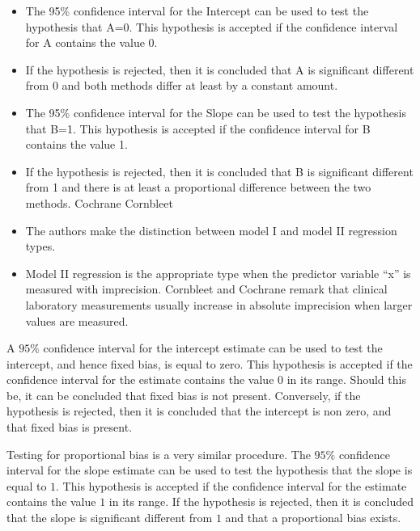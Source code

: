\documentclass[12pt, a4paper]{report}
\theoremstyle{plain}
\theoremstyle{definition}
\theoremstyle{remark}
\begin{document}
\begin{itemize}
	
	\item The 95\% confidence interval for the Intercept can be used to test the hypothesis that A=0. This hypothesis is accepted if the confidence interval for A contains the value 0. 
	\item If the hypothesis is rejected, then it is concluded that A is significant different from 0 and both methods differ at least by a constant amount. 
	
	\item The 95\% confidence interval for the Slope can be used to test the hypothesis that B=1. This hypothesis is accepted if the confidence interval for B contains the value 1. 
	
	\item If the hypothesis is rejected, then it is concluded that B is significant different from 1 and there is at least a proportional difference between the two methods. Cochrane Cornbleet
	\item The authors make the distinction between model I and model II regression types.
	\item Model II regression is the appropriate type when the predictor variable “x” is measured with imprecision.
	Cornbleet and Cochrane remark that clinical laboratory measurements usually increase in absolute imprecision when larger values are measured. %
\end{itemize}

A $95\%$ confidence interval for the intercept estimate can be used to test the intercept, and hence fixed bias, is equal to
zero. This hypothesis is accepted if the confidence interval for the estimate contains the value $0$ in its range. Should this be,
it can be concluded that fixed bias is not present. Conversely, if the hypothesis is rejected, then it is concluded that the
intercept is non zero, and that fixed bias is present.

Testing for proportional bias is a very similar procedure. The $95\%$ confidence interval for the slope estimate can be used to
test the hypothesis that the slope is equal to $1$. This hypothesis is accepted if the confidence interval for the estimate
contains the value $1$ in its range. If the hypothesis is rejected, then it is concluded that the slope is significant
different from $1$ and that a proportional bias exists.
\end{document}
